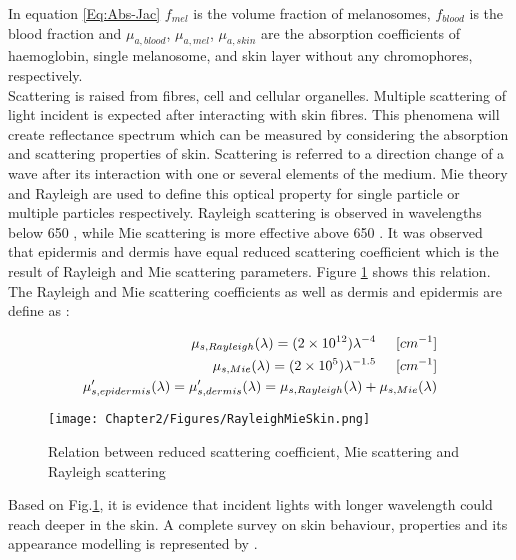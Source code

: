 	In equation \ref{Eq:Abs-Jac} $f_{mel}$ is the volume fraction of melanosomes, $f_{blood}$ is the blood fraction  and $\mu_{a,blood}$, $\mu_{a,mel}$, $\mu_{a,skin}$ are the absorption coefficients of haemoglobin, single melanosome, and skin layer without any chromophores, respectively. \\

	Scattering is raised from fibres, cell and cellular organelles. Multiple scattering of light incident is expected after interacting with skin fibres. This phenomena will create reflectance spectrum which can be measured by considering the absorption and scattering properties of skin. Scattering is referred to a direction change of a wave after its interaction with one or several elements of the medium. Mie theory and Rayleigh are used to define this optical property for single particle or multiple particles respectively. Rayleigh scattering is observed in wavelengths below 650 \nano\meter, while Mie scattering is more effective above 650 \nano\meter. It was observed that epidermis and dermis have equal reduced scattering coefficient which is the result of Rayleigh and Mie scattering parameters. Figure \ref{fig:RayMieSkin} shows this relation. The Rayleigh and Mie scattering coefficients as well as dermis and epidermis are define as \cite{jacques1996origins}: 

	\begin{subequations}
	\begin{align}
	\mu_{s, Rayleigh}(\lambda) = (2\times 10^{12})\lambda^{-4} \hspace{0.5 cm} [cm^{-1}]\\
	\mu_{s, Mie}(\lambda) = (2\times 10^{5})\lambda^{-1.5} \hspace{0.5 cm} [cm^{-1}]\\
	\mu'_{s, epidermis}(\lambda) = \mu'_{s, dermis}(\lambda) = \mu_{s, Rayleigh}(\lambda) + \mu_{s, Mie}(\lambda) 
	\end{align}		
	\label{Eq:SEpiDer}
	\end{subequations}

	\begin{figure}
	\centering 
	\texttt{[image: Chapter2/Figures/RayleighMieSkin.png]}	
	\caption{Relation between reduced scattering coefficient, Mie scattering and Rayleigh scattering \cite{jacques1996origins}}
	\label{fig:RayMieSkin}
	\end{figure}
 Based on Fig.\ref{fig:RayMieSkin}, it is evidence that incident lights with longer wavelength could reach deeper in the skin. A complete survey on skin behaviour, properties and its appearance modelling is represented by \cite{igarashi2007appearance}. 
	
